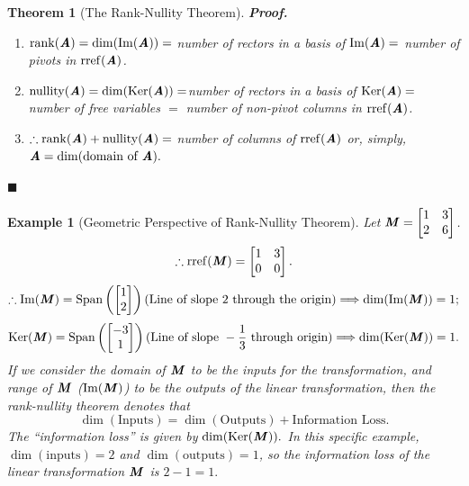\documentclass[12pt, a4paper]{article}
\newtheorem{thm}{Theorem}[subsection]
\newtheorem{eg}{Example}[subsection]
\newenvironment*{prf}{\indent\textbf{\textit{Proof. }}}{\hfill $\blacksquare$\par}
\def\IM{{\mathrm{Im}}}
\def\rref{\mathrm{rref}}
\def\Span{\mathrm{Span}}
\def\Ker{\mathrm{Ker}}
\def\rank{\mathrm{rank}}
\def\nullity{\mathrm{nullity}}
\def\matrixA{\textbf{\emph{A}}}
\def\matrixM{\textbf{\emph{M}}}
\begin{document}
\begin{thm}[The Rank-Nullity Theorem]
	\begin{prf}
		\begin{enumerate}
			\item $\rank(\matrixA)=\dim(\IM(\matrixA))=$ number of rectors in a basis of $\IM(\matrixA)=$ number of pivots in $\rref(\matrixA)$.
			\item  $\nullity(\matrixA)=\dim(\Ker(\matrixA))=$number of rectors in a basis of $\Ker(\matrixA)=$ number of free variables $=$ number of non-pivot columns in $\rref(\matrixA)$.
			\item $\therefore\rank(\matrixA)+\nullity(\matrixA)=$ number of columns of $\rref(\matrixA)$ or, simply, $\matrixA=\dim(\text{domain of }\matrixA).$
		\end{enumerate}
	\end{prf}
\end{thm}
\begin{eg}[Geometric Perspective of Rank-Nullity Theorem]
	Let $\matrixM=\begin{bmatrix}1&3\\2&6\end{bmatrix}$.\[\therefore\rref(\matrixM)=\begin{bmatrix}1&3\\0&0\end{bmatrix}.\]
	\[\therefore\IM(\matrixM)=\Span\left(\begin{bmatrix}1\\2\end{bmatrix}\right) (\text{Line of slope }2\text{ through the origin})\Longrightarrow\dim(\IM(\matrixM))=1;\]
	\[\Ker(\matrixM)=\Span\left(\begin{bmatrix}-3\\1\end{bmatrix}\right)(\text{Line of slope }-\frac{1}{3}\text{ through origin})\Longrightarrow\dim(\Ker(\matrixM))=1.\] 
	If we consider the domain of $\matrixM$ to be the inputs for the transformation, and range of $\matrixM$ ($\IM(\matrixM)$) to be the outputs of the linear transformation, then the rank-nullity theorem denotes that \[\dim(\text{Inputs})=\dim(\text{Outputs})+\text{Information Loss}.\]
	The ``information loss'' is given by $\dim(\Ker(\matrixM)).$ In this specific example, $\dim(\text{inputs})=2$ and $\dim(\text{outputs})=1$, so the information loss of the linear transformation $\matrixM$ is $2-1=1.$
	\begin{center}
		\begin{tikzpicture}[x=0.75pt,y=0.75pt,yscale=-1,xscale=1]

\end{tikzpicture}
\end{center}
\end{eg}
\end{document}
